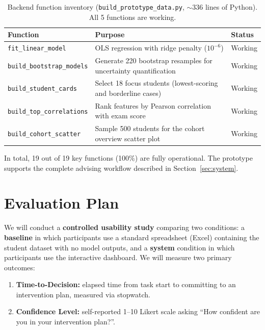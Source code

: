 \documentclass[11pt]{article}
\begin{document}
\begin{table}[t]
\centering
\small
\renewcommand{\arraystretch}{1.2}
\begin{tabular}{l p{6cm} l}
\toprule
\textbf{Function} & \textbf{Purpose} & \textbf{Status} \\
\midrule
\texttt{fit\_linear\_model} & OLS regression with ridge penalty ($10^{-6}$) & Working \\
\texttt{build\_bootstrap\_models} & Generate 220 bootstrap resamples for uncertainty quantification & Working \\
\texttt{build\_student\_cards} & Select 18 focus students (lowest-scoring and borderline cases) & Working \\
\texttt{build\_top\_correlations} & Rank features by Pearson correlation with exam score & Working \\
\texttt{build\_cohort\_scatter} & Sample 500 students for the cohort overview scatter plot & Working \\
\bottomrule
\end{tabular}
\caption{Backend function inventory (\texttt{build\_prototype\_data.py}, ${\sim}336$ lines of Python). All 5 functions are working.}
\label{tab:backend-functions}
\end{table}

In total, 19 out of 19 key functions (100\%) are fully operational. The prototype supports the complete advising workflow described in Section~\ref{sec:system}.

\section{Evaluation Plan}
\label{sec:evaluation}

We will conduct a \textbf{controlled usability study} comparing two conditions: a \textbf{baseline} in which participants use a standard spreadsheet (Excel) containing the student dataset with no model outputs, and a \textbf{system} condition in which participants use the interactive dashboard. We will measure two primary outcomes:

\begin{enumerate}
  \item \textbf{Time-to-Decision:} elapsed time from task start to committing to an intervention plan, measured via stopwatch.
  \item \textbf{Confidence Level:} self-reported 1--10 Likert scale asking ``How confident are you in your intervention plan?''.
\end{enumerate}
\end{document}
